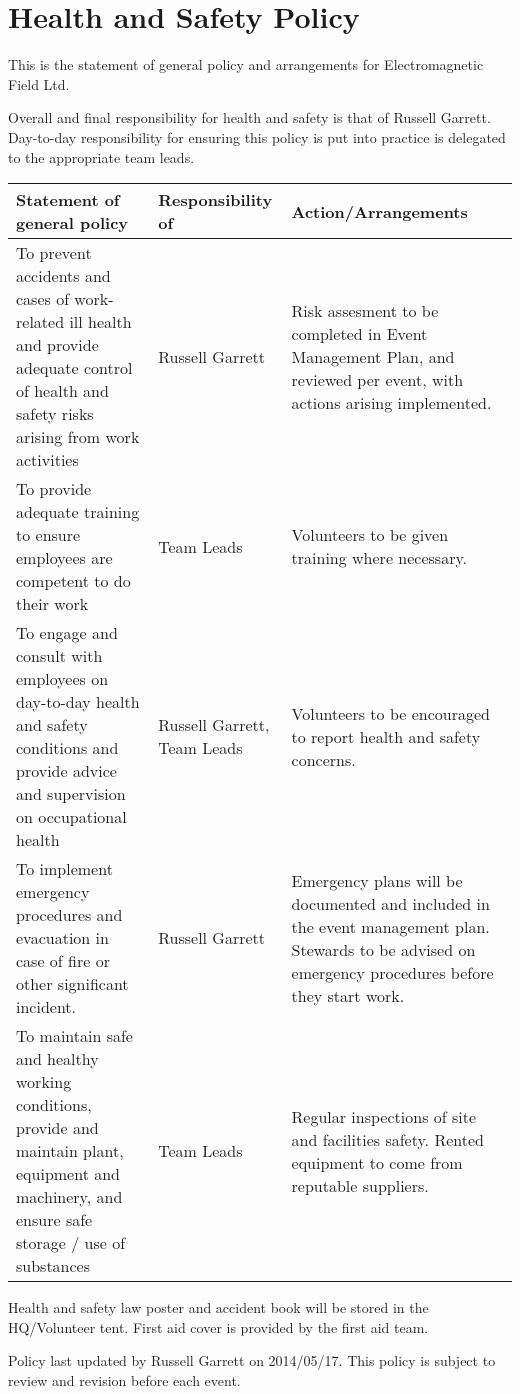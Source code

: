 



\section{Health and Safety Policy}

This is the statement of general policy and arrangements for Electromagnetic Field Ltd.

Overall and final responsibility for health and safety is that of Russell Garrett.
Day-to-day responsibility for ensuring this policy is put into practice is delegated to the appropriate team leads.

\tabulinesep=2mm
\begin{tabu}{| p{7cm} | p{3cm} | p{5cm} |} \hline
  \rowfont{\bfseries} Statement of general policy & Responsibility of & Action/Arrangements \\ \hline
To prevent accidents and cases of work-related ill health and provide adequate control of health and safety risks arising from work activities & Russell Garrett & Risk assesment to be completed in Event Management Plan, and reviewed per event, with actions arising implemented. \\ \hline
To provide adequate training to ensure employees are competent to do their work & Team Leads & Volunteers to be given training where necessary. \\ \hline
To engage and consult with employees on day-to-day health and safety conditions and provide advice and supervision on occupational health & Russell Garrett, Team Leads & Volunteers to be encouraged to report health and safety concerns. \\ \hline
To implement emergency procedures and evacuation in case of fire or other significant incident. & Russell Garrett & Emergency plans will be documented and included in the event management plan. Stewards to be advised on emergency procedures before they start work. \\ \hline
To maintain safe and healthy working conditions, provide and maintain plant, equipment and machinery, and ensure safe storage / use of substances & Team Leads & Regular inspections of site and facilities safety. Rented equipment to come from reputable suppliers. \\ \hline
\end{tabu}

Health and safety law poster and accident book will be stored in the HQ/Volunteer tent. First aid cover is provided by the first aid team.

Policy last updated by Russell Garrett on 2014/05/17. This policy is subject to review and revision before each event.


